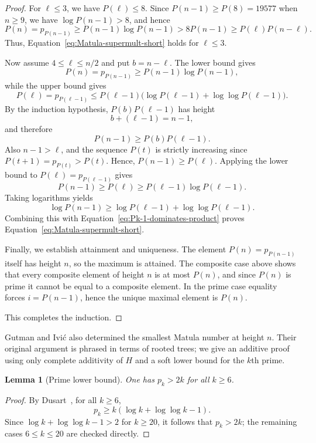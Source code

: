 \documentclass[11pt]{article}
\newtheorem{lemma}{Lemma}
\theoremstyle{definition}
\begin{document}
\begin{proof}
For $\ell\le3$, we have $P(\ell)\le8$.  Since $P(n-1)\ge P(8)=19577$ when
$n\ge9$, we have $\log P(n-1)>8$, and hence
\[
  P(n)=p_{P(n-1)}
  \ge P(n-1)\log P(n-1)
  >8P(n-1)
  \ge P(\ell)P(n-\ell).
\]
Thus, Equation~\eqref{eq:Matula-supermult-short} holds for $\ell\le3$.

Now assume $4\le \ell\le n/2$ and put $b=n-\ell$.  The lower bound gives
\[
  P(n)=p_{P(n-1)}\ge P(n-1)\log P(n-1),
\]
while the upper bound gives
\[
  P(\ell)=p_{P(\ell-1)}
  \le
  P(\ell-1)\bigl(\log P(\ell-1)+\log\log P(\ell-1)\bigr).
\]
By the induction hypothesis, $P(b)P(\ell-1)$ has height
\[
  b+(\ell-1)=n-1,
\]
and therefore
\begin{equation}\label{eq:Pk-1-dominates-product}
  P(n-1)\ge P(b)P(\ell-1).
\end{equation}
Also $n-1>\ell$, and the sequence $P(t)$ is strictly increasing since
$P(t+1)=p_{P(t)}>P(t)$.  Hence, $P(n-1)\ge P(\ell)$.  Applying the lower
bound to $P(\ell)=p_{P(\ell-1)}$ gives
\[
  P(n-1)\ge P(\ell)
  \ge P(\ell-1)\log P(\ell-1).
\]
Taking logarithms yields
\[
  \log P(n-1)
  \ge
  \log P(\ell-1)+\log\log P(\ell-1).
\]
Combining this with Equation~\eqref{eq:Pk-1-dominates-product} proves
Equation~\eqref{eq:Matula-supermult-short}.

Finally, we establish attainment and uniqueness.  The element $P(n)=p_{P(n-1)}$ itself has height $n$, so the maximum is attained.
The composite case above shows that every composite element of height $n$ is at
most $P(n)$, and since $P(n)$ is prime it cannot be equal to a composite
element.  In the prime case equality forces $i=P(n-1)$, hence the unique
maximal element is $P(n)$.

This completes the induction.
\end{proof}


Gutman and Ivi\'c also determined the smallest Matula number at height $n$.
Their original argument is phrased in terms of rooted trees; we give an
additive proof using only complete additivity of $H$ and a soft lower bound for
the $k$th prime.

\begin{lemma}[Prime lower bound]\label{lem:pk-gt-2k}
One has $p_k>2k$ for all $k\ge 6$.
\end{lemma}

\begin{proof}
By Dusart~\cite{dusart2018}, for all $k\ge 6$, 
\[
  p_k \ge k(\log k+\log\log k-1).
\]
Since $\log k+\log\log k-1>2$ for $k\ge 20$, it follows that $p_k>2k$; the remaining cases $6\le k\le 20$ are checked directly.
\end{proof}
\end{document}
